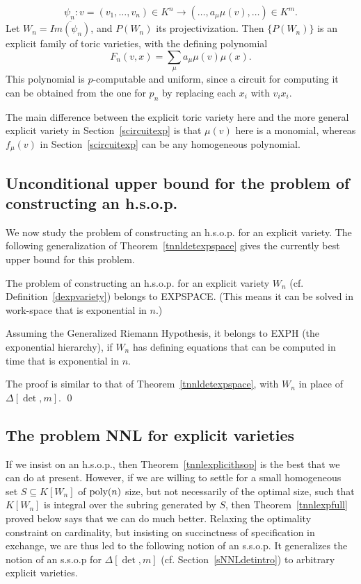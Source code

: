 \documentclass[11pt]{article}
\begin{document}
\[ \psi_n: v=(v_1,\ldots,v_n) \in K^n \rightarrow  (\ldots, a_\mu \mu(v),\ldots) \in  K^m.\] 
Let $W_n=\overline{Im(\psi_n)}$, and $P(W_n)$ its projectivization. Then 
$\{P(W_n)\}$ is  an explicit family of  toric varieties, with the defining polynomial 
\[ F_n(v,x)=\sum_\mu a_\mu \mu(v) \mu(x).\] 
This polynomial  is $p$-computable and uniform, since a circuit for computing it can be
obtained from the one for $p_n$ by replacing each  $x_i$ with $v_i x_i$. 

The main difference between the explicit toric variety here and the 
more general explicit variety in Section~\ref{scircuitexp} is that $\mu(v)$ here 
is a monomial, whereas $f_\mu(v)$ in
Section~\ref{scircuitexp} can be any homogeneous polynomial.


\subsection{Unconditional upper bound for the problem of constructing an h.s.o.p.} \label{shsopgenexp}
We now study the problem of constructing an h.s.o.p. for an explicit variety.
The following  generalization of  Theorem~\ref{tnnldetexpspace} gives the currently best upper bound for this problem.


\begin{theorem} \label{tnnlexplicithsop}
The problem of constructing an h.s.o.p. for an explicit variety $W_n$ (cf. Definition~\ref{dexpvariety}) 
belongs to EXPSPACE. (This means it can be solved in work-space that is exponential in $n$.)

Assuming the Generalized Riemann Hypothesis, it belongs to EXPH (the exponential hierarchy), if 
$W_n$ has  defining equations
that can be computed in time that is exponential in $n$.
\end{theorem}

\proof The proof is similar to that of Theorem~\ref{tnnldetexpspace},
with $W_n$ in place of $\Delta[\det,m]$.
\qed



\subsection{The problem NNL  for explicit varieties}  \label{simpliexp}
If we insist on an h.s.o.p., then Theorem~\ref{tnnlexplicithsop} is the best that we can do at present.
However, if we are  willing to settle for a small homogeneous set $S \subseteq K[W_n]$ of ${\mbox {poly}}(n)$ size, but not necessarily of the
optimal size, such that $K[W_n]$ is integral over the subring generated by $S$, then Theorem~\ref{tnnlexpfull}
proved  below says that we can do much better.
Relaxing the optimality constraint on  cardinality, 
but insisting on succinctness of specification in exchange, we are thus led  to the following notion of an s.s.o.p.
It   generalizes  the notion  of an s.s.o.p for $\Delta[\det,m]$ (cf. 
Section~\ref{sNNLdetintro}) to arbitrary explicit varieties. 
\end{document}
